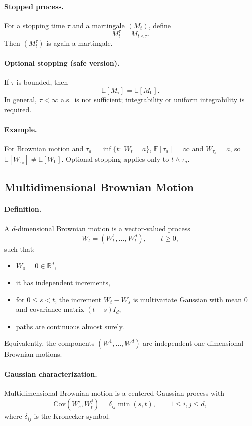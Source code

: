 \documentclass[11pt]{article}
\newcommand{\R}{\mathbb{R}}
\newcommand{\E}{\mathbb{E}}
\newcommand{\Cov}{\mathrm{Cov}}
\newcommand{\1}{\mathbf{1}}
\theoremstyle{plain}
\theoremstyle{definition}
\theoremstyle{remark}
\begin{document}
\paragraph{Stopped process.}
For a stopping time $\tau$ and a martingale $(M_t)$, define
\[
M_t^\tau=M_{t\wedge\tau}.
\]
Then $(M_t^\tau)$ is again a martingale.

\paragraph{Optional stopping (safe version).}
If $\tau$ is bounded, then
\[
\E[M_\tau]=\E[M_0].
\]
In general, $\tau<\infty$ a.s.\ is not sufficient;
integrability or uniform integrability is required.

\paragraph{Example.}
For Brownian motion and $\tau_a=\inf\{t:\ W_t=a\}$,
$\E[\tau_a]=\infty$ and $W_{\tau_a}=a$,
so $\E[W_{\tau_a}]\neq\E[W_0]$.
Optional stopping applies only to $t\wedge\tau_a$.

\medskip
\subsection{Multidimensional Brownian Motion}

\paragraph{Definition.}
A $d$-dimensional Brownian motion is a vector-valued process
\[
W_t=(W_t^1,\dots,W_t^d),\qquad t\ge 0,
\]
such that:
\begin{itemize}
  \item $W_0=0\in\R^d$,
  \item it has independent increments,
  \item for $0\le s<t$, the increment $W_t-W_s$ is multivariate Gaussian
  with mean $0$ and covariance matrix $(t-s)I_d$,
  \item paths are continuous almost surely.
\end{itemize}

Equivalently, the components $(W^1,\dots,W^d)$ are independent
one-dimensional Brownian motions.

\paragraph{Gaussian characterization.}
Multidimensional Brownian motion is a centered Gaussian process with
\[
\Cov(W_s^i,W_t^j)=\delta_{ij}\min(s,t),
\qquad 1\le i,j\le d,
\]
where $\delta_{ij}$ is the Kronecker symbol.
\end{document}
